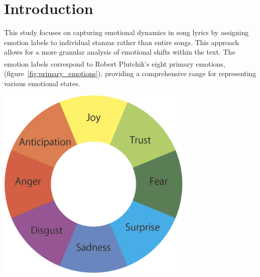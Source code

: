 \chapter*{Introduction}
\label{ch:Introduction}

\noindent
\begin{minipage}{0.65\textwidth}
    This study focuses on capturing emotional dynamics in song lyrics by assigning
    emotion labels to individual stanzas rather than entire songs.
    This approach allows for a more granular analysis of emotional shifts within
    the text.
    The emotion labels correspond to Robert Plutchik's eight primary emotions\textsuperscript{\cite{plutchik1980general}},
    (figure~\ref{fig:primary_emotions}),
    providing a comprehensive range for representing various emotional states.
\end{minipage}
\hfill
\begin{minipage}{0.27\textwidth}
    \centering
    \includegraphics[width=\textwidth]{pictures/plutchik_primary_emotions.png}
    \label{fig:primary_emotions}
\end{minipage}\\



